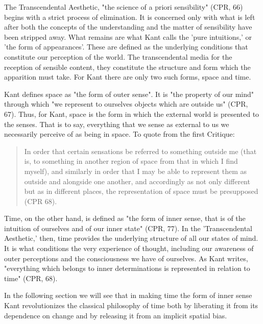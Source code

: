 The Transcendental Aesthetic, "the science of a priori sensibility"
(CPR, 66) begins with a strict process of elimination. It is concerned only with what is left after both the concepts of the understanding and the matter of sensibility have been stripped away. What remains are what Kant calls the 'pure intuitions,' or 'the form of appearances'. These are defined as the underlying conditions that constitute our perception of the world. The transcendental media for the reception of sensible content, they constitute the structure and form which the apparition must take. For Kant there are only two such forms, space and time. 

Kant defines space as "the form of outer sense". It is "the property of our mind" through which "we represent to ourselves objects which are outside us" (CPR, 67). Thus, for Kant, space is the form in which the external world is presented to the senses. That is to say, everything that we sense as external to us we necessarily perceive of as being in space. To quote from
the first Critique: 

\begin{quote}
    In order that certain sensations be referred to something outside me (that is, to something in another region of space from that in which I find myself), and similarly in order that I may be able to represent them as outside and alongside one another, and accordingly as not only different but as in different places, the representation of space must be presupposed (CPR 68).
\end{quote}

Time, on the other hand, is defined as "the form of inner sense, that is of the intuition of ourselves and of our inner state" (CPR, 77). In the 'Transcendental Aesthetic,' then, time provides the underlying structure of all our states of mind. It is what conditions the very experience of thought, including our awareness of outer perceptions and the consciousness we have of ourselves. As Kant writes, "everything which belongs to inner determinations is represented in relation to time" (CPR, 68).

In the following section we will see that in making time the form of inner sense Kant revolutionizes the classical philosophy of time both by liberating it from its dependence on change and by releasing it from an implicit spatial bias. 

